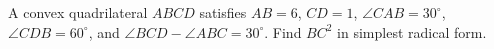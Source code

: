 A convex quadrilateral $ABCD$ satisfies $AB=6$, $CD=1$, $\angle CAB=30^\circ$, $\angle CDB=60^\circ$, and $\angle BCD-\angle ABC=30^\circ$. Find $BC^2$ in simplest radical form.
